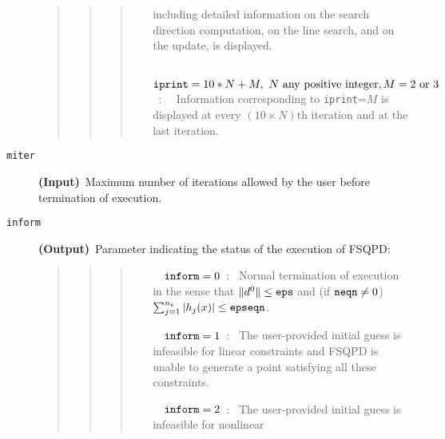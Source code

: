 \begin{description}
\begin{quote}
\begin{quote}
\begin{quote}
\begin{itemize}
                                including detailed information on the search 
                                direction computation, on the line search,
                                and on the update, is displayed.
                  \item[~~${\tt iprint} =10*N+M,~N~{\rm any~positive~integer},
                                M=2~{\rm or}~3$~:~~] 
                                Information corresponding to {\tt iprint}=$M$
                                is displayed at every $(10\times N)$th
                                iteration and at the last iteration.
                  \end{itemize}
                  \end{quote}
                  \end{quote}
                  \end{quote}
\item[\tt miter] {\bf (Input)}~Maximum number of iterations
allowed by the user before termination of execution.
\item[\tt inform] {\bf (Output)}~Parameter indicating the status of
                   the execution of FSQPD:
                   \begin{quote}
                   \begin{quote}
                   \begin{quote}
                   \begin{itemize}
                  \item[~~${\tt inform} = 0$~:~] Normal termination of 
                               execution in the sense that 
                         $\|d^0\|\leq {\tt eps}$
                         and (if ${\tt neqn} \ne 0$) 
                         $\sum_{j=1}^{n_e}|h_j(x)|\leq {\tt epseqn}$.
                  \item[~~${\tt inform} = 1$~:~] The user-provided 
                                                 initial guess
                                                 is infeasible for
                                                 linear constraints and 
                                                 FSQPD is unable to 
                                                 generate a point
                                                 satisfying all these 
                                                 constraints.
                  \item[~~${\tt inform} = 2$~:~] The user-provided 
                                                 initial guess
                                                 is infeasible for nonlinear 

\end{itemize}
\end{quote}
\end{quote}
\end{quote}
\end{description}
